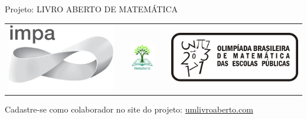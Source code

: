 \begin{center}
Projeto: LIVRO ABERTO DE MATEMÁTICA

\noindent \begin{tabular}{lcccr}
\includegraphics[scale=.15]{impa}& \quad\quad& \includegraphics[width=3cm]{logo} & \quad\quad& \includegraphics[scale=.24]{obmep} 
\end{tabular}
\end{center}

\vspace*{.3cm}

Cadastre-se como colaborador no site do projeto: \url{umlivroaberto.com}




